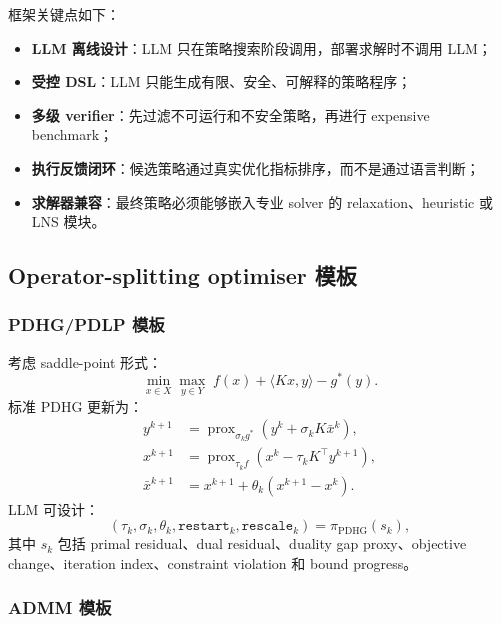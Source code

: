 \documentclass[UTF8,a4paper,12pt,fontset=fandol]{ctexart}
\begin{document}
框架关键点如下：
\begin{itemize}[leftmargin=2em]
    \item \textbf{LLM 离线设计}：LLM 只在策略搜索阶段调用，部署求解时不调用 LLM；
    \item \textbf{受控 DSL}：LLM 只能生成有限、安全、可解释的策略程序；
    \item \textbf{多级 verifier}：先过滤不可运行和不安全策略，再进行 expensive benchmark；
    \item \textbf{执行反馈闭环}：候选策略通过真实优化指标排序，而不是通过语言判断；
    \item \textbf{求解器兼容}：最终策略必须能够嵌入专业 solver 的 relaxation、heuristic 或 LNS 模块。
\end{itemize}

\subsection{Operator-splitting optimiser 模板}

\subsubsection{PDHG/PDLP 模板}

考虑 saddle-point 形式：
\begin{equation}
\min_{x \in X} \max_{y \in Y} \; f(x) + \langle Kx, y\rangle - g^\ast(y).
\end{equation}
标准 PDHG 更新为：
\begin{equation}
\begin{aligned}
y^{k+1} &= \operatorname{prox}_{\sigma_k g^\ast}\left(y^k + \sigma_k K\bar{x}^k\right),\\
x^{k+1} &= \operatorname{prox}_{\tau_k f}\left(x^k - \tau_k K^\top y^{k+1}\right),\\
\bar{x}^{k+1} &= x^{k+1} + \theta_k(x^{k+1}-x^k).
\end{aligned}
\end{equation}
LLM 可设计：
\begin{equation}
(\tau_k,\sigma_k,\theta_k,\texttt{restart}_k,\texttt{rescale}_k)
= \pi_{\text{PDHG}}(s_k),
\end{equation}
其中 $s_k$ 包括 primal residual、dual residual、duality gap proxy、objective change、iteration index、constraint violation 和 bound progress。

\subsubsection{ADMM 模板}
\end{document}
